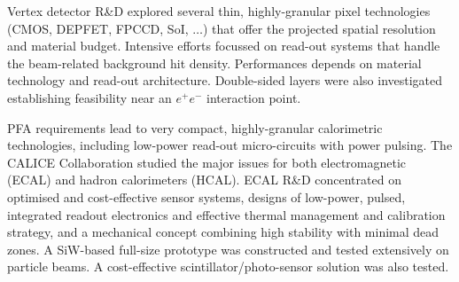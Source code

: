 \documentclass[%
 reprint,
 amsmath,amssymb,
 aps,
]{revtex4-1}
\def\ee{e^+e^-}
\begin{document}

Vertex detector R\&D explored several
thin, highly-granular pixel technologies (CMOS, DEPFET, FPCCD, SoI,
$\ldots$) that offer the projected spatial resolution and material
budget. Intensive efforts focussed on read-out systems that 
handle the beam-related background hit density.  
Performances depends on material technology and read-out
architecture.   Double-sided layers were also investigated
establishing feasibility near an $\ee$
 interaction point.



PFA requirements lead to very compact, highly-granular
calorimetric technologies, including
low-power
read-out micro-circuits
with power pulsing.
The CALICE Collaboration studied the major issues
for both electromagnetic (ECAL) and  hadron calorimeters (HCAL).
ECAL R\&D concentrated on
optimised and cost-effective sensor systems, designs of 
low-power, pulsed, integrated readout electronics and effective
thermal management and calibration strategy, and  a
mechanical concept combining high stability with minimal dead
zones. 
A SiW-based full-size prototype was constructed and tested
extensively on particle beams. 
A cost-effective scintillator/photo-sensor solution
was also tested.
\end{document}
